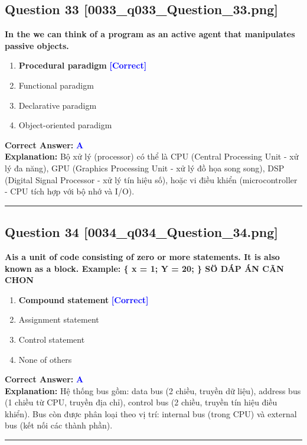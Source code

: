 \documentclass[11pt,a4paper]{article}
\begin{document}
\begin{minipage}{\textwidth}
\subsection*{Question 33 \quad \footnotesize{[0033\_q033\_Question\_33.png]}}
\noindent \textbf{In the we can think of a program as an active agent that manipulates passive objects.}

\begin{enumerate}[label=\Alph*.]
    \item \textbf{Procedural paradigm} \hfill \textcolor{blue}{\textbf{[Correct]}}
    \item Functional paradigm
    \item Declarative paradigm
    \item Object-oriented paradigm
\end{enumerate}

\noindent \textbf{Correct Answer:} \textcolor{blue}{\textbf{A}} \\[2pt]
\noindent \textbf{Explanation:} Bộ xử lý (processor) có thể là CPU (Central Processing Unit - xử lý đa năng), GPU (Graphics Processing Unit - xử lý đồ họa song song), DSP (Digital Signal Processor - xử lý tín hiệu số), hoặc vi điều khiển (microcontroller - CPU tích hợp với bộ nhớ và I/O).

\par\vspace{0.3cm}
\hrule
\vspace{0.3cm}
\end{minipage}

\begin{minipage}{\textwidth}
\subsection*{Question 34 \quad \footnotesize{[0034\_q034\_Question\_34.png]}}
\noindent \textbf{Ais a unit of code consisting of zero or more statements. It is also known as a block. Example: \{ x = 1; Y = 20; \} SÖ DÁP ÁN CÃN CHON}

\begin{enumerate}[label=\Alph*.]
    \item \textbf{Compound statement} \hfill \textcolor{blue}{\textbf{[Correct]}}
    \item Assignment statement
    \item Control statement
    \item None of others
\end{enumerate}

\noindent \textbf{Correct Answer:} \textcolor{blue}{\textbf{A}} \\[2pt]
\noindent \textbf{Explanation:} Hệ thống bus gồm: data bus (2 chiều, truyền dữ liệu), address bus (1 chiều từ CPU, truyền địa chỉ), control bus (2 chiều, truyền tín hiệu điều khiển). Bus còn được phân loại theo vị trí: internal bus (trong CPU) và external bus (kết nối các thành phần).

\par\vspace{0.3cm}
\hrule
\vspace{0.3cm}
\end{minipage}
\end{document}

